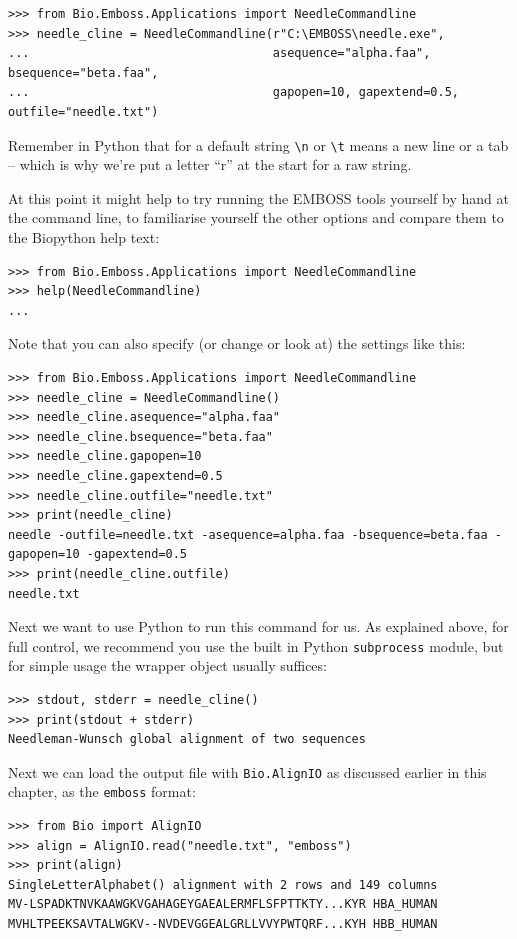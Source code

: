 \documentclass{report}
\begin{document}
\begin{verbatim}
>>> from Bio.Emboss.Applications import NeedleCommandline
>>> needle_cline = NeedleCommandline(r"C:\EMBOSS\needle.exe",
...                                  asequence="alpha.faa", bsequence="beta.faa",
...                                  gapopen=10, gapextend=0.5, outfile="needle.txt")
\end{verbatim}

\noindent Remember in Python that for a default string \verb|\n| or \verb|\t| means a
new line or a tab -- which is why we're put a letter ``r'' at the start for a raw string.

At this point it might help to try running the EMBOSS tools yourself by hand at the
command line, to familiarise yourself the other options and compare them to the
Biopython help text:

\begin{verbatim}
>>> from Bio.Emboss.Applications import NeedleCommandline
>>> help(NeedleCommandline)
...
\end{verbatim}

Note that you can also specify (or change or look at) the settings like this:

\begin{verbatim}
>>> from Bio.Emboss.Applications import NeedleCommandline
>>> needle_cline = NeedleCommandline()
>>> needle_cline.asequence="alpha.faa"
>>> needle_cline.bsequence="beta.faa"
>>> needle_cline.gapopen=10
>>> needle_cline.gapextend=0.5
>>> needle_cline.outfile="needle.txt"
>>> print(needle_cline)
needle -outfile=needle.txt -asequence=alpha.faa -bsequence=beta.faa -gapopen=10 -gapextend=0.5
>>> print(needle_cline.outfile)
needle.txt
\end{verbatim}

Next we want to use Python to run this command for us. As explained above,
for full control, we recommend you use the built in Python \texttt{subprocess}
module, but for simple usage the wrapper object usually suffices:

\begin{verbatim}
>>> stdout, stderr = needle_cline()
>>> print(stdout + stderr)
Needleman-Wunsch global alignment of two sequences
\end{verbatim}

Next we can load the output file with \verb|Bio.AlignIO| as
discussed earlier in this chapter, as the \texttt{emboss} format:

\begin{verbatim}
>>> from Bio import AlignIO
>>> align = AlignIO.read("needle.txt", "emboss")
>>> print(align)
SingleLetterAlphabet() alignment with 2 rows and 149 columns
MV-LSPADKTNVKAAWGKVGAHAGEYGAEALERMFLSFPTTKTY...KYR HBA_HUMAN
MVHLTPEEKSAVTALWGKV--NVDEVGGEALGRLLVVYPWTQRF...KYH HBB_HUMAN
\end{verbatim}
\end{document}
